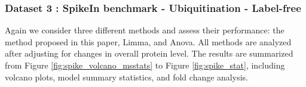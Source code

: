 \documentclass{mcp}
\begin{document}
\subsubsection{Dataset 3 : SpikeIn benchmark - Ubiquitination - Label-free}
\label{sec:benchmark}



Again we consider three different methods and assess their performance: the method proposed in this paper, Limma, and Anova. All methods are analyzed after adjusting for changes in overall protein level. The results are summarized from Figure \ref{fig:spike_volcano_msstats} to Figure \ref{fig:spike_stat}, including volcano plots, model summary statistics, and fold change analysis.
\end{document}
